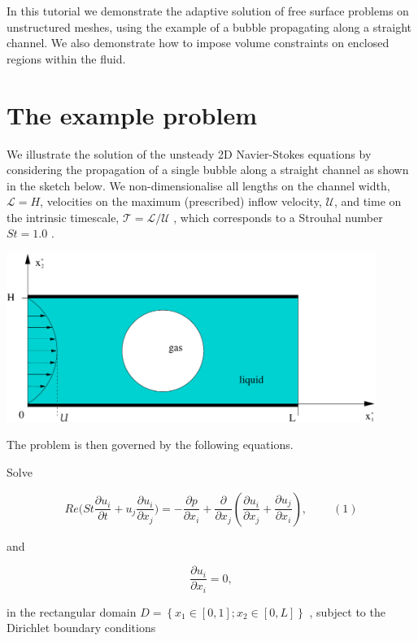 In this tutorial we demonstrate the adaptive solution of free surface problems on unstructured meshes, using the example of a bubble propagating along a straight channel. We also demonstrate how to impose volume constraints on enclosed regions within the fluid.



 

\hypertarget{index_example}{}\section{The example problem}\label{index_example}
We illustrate the solution of the unsteady 2D Navier-\/\+Stokes equations by considering the propagation of a single bubble along a straight channel as shown in the sketch below. We non-\/dimensionalise all lengths on the channel width, $ \mathcal{L}=H $, velocities on the maximum (prescribed) inflow velocity, $ \mathcal{U} $, and time on the intrinsic timescale, $ \mathcal{T}=\mathcal{L}/\mathcal{U} $ , which corresponds to a Strouhal number $ St=1.0 $ .

 
\begin{DoxyImage}
\includegraphics[width=0.9\textwidth]{problem}
\end{DoxyImage}


The problem is then governed by the following equations.

Solve

\[ Re\Big(St\frac{\partial u_i}{\partial t}+u_j\frac{\partial u_i}{\partial x_j} \Big) = - \frac{\partial p}{\partial x_i} + \frac{\partial }{\partial x_j} \left( \frac{\partial u_i}{\partial x_j} + \frac{\partial u_j}{\partial x_i} \right), \ \ \ \ \ \ \ \ \ \ (1) \]

and

\[ \frac{\partial u_i}{\partial x_i} = 0, \]

in the rectangular domain $ D = \left\{x_1 \in [0,1]; x_2 \in [0,L] \right\} $ , subject to the Dirichlet boundary conditions

